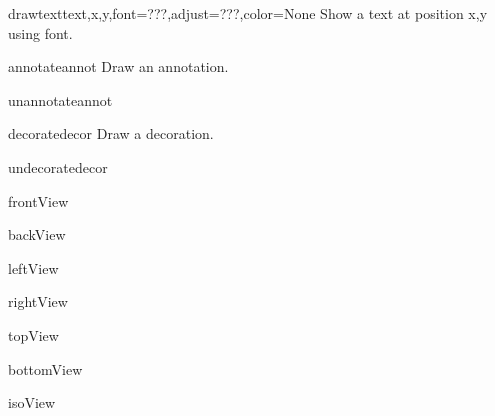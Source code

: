 \begin{funcdesc}{drawtext}{text,x,y,font=???,adjust=???,color=None}
Show a text at position x,y using font.

\end{funcdesc}


\begin{funcdesc}{annotate}{annot}
Draw an annotation.

\end{funcdesc}


\begin{funcdesc}{unannotate}{annot}


\end{funcdesc}


\begin{funcdesc}{decorate}{decor}
Draw a decoration.

\end{funcdesc}


\begin{funcdesc}{undecorate}{decor}


\end{funcdesc}


\begin{funcdesc}{frontView}{}


\end{funcdesc}


\begin{funcdesc}{backView}{}


\end{funcdesc}


\begin{funcdesc}{leftView}{}


\end{funcdesc}


\begin{funcdesc}{rightView}{}


\end{funcdesc}


\begin{funcdesc}{topView}{}


\end{funcdesc}


\begin{funcdesc}{bottomView}{}


\end{funcdesc}


\begin{funcdesc}{isoView}{}


\end{funcdesc}


